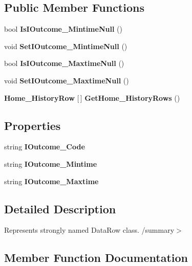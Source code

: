 \subsection*{Public Member Functions}
\begin{DoxyCompactItemize}
\item 
bool \textbf{ Is\+I\+Outcome\+\_\+\+Mintime\+Null} ()
\item 
void \textbf{ Set\+I\+Outcome\+\_\+\+Mintime\+Null} ()
\item 
bool \textbf{ Is\+I\+Outcome\+\_\+\+Maxtime\+Null} ()
\item 
void \textbf{ Set\+I\+Outcome\+\_\+\+Maxtime\+Null} ()
\item 
\textbf{ Home\+\_\+\+History\+Row} [$\,$] \textbf{ Get\+Home\+\_\+\+History\+Rows} ()
\end{DoxyCompactItemize}
\subsection*{Properties}
\begin{DoxyCompactItemize}
\item 
string \textbf{ I\+Outcome\+\_\+\+Code}\hspace{0.3cm}{\ttfamily  [get, set]}
\item 
string \textbf{ I\+Outcome\+\_\+\+Mintime}\hspace{0.3cm}{\ttfamily  [get, set]}
\item 
string \textbf{ I\+Outcome\+\_\+\+Maxtime}\hspace{0.3cm}{\ttfamily  [get, set]}
\end{DoxyCompactItemize}


\subsection{Detailed Description}
Represents strongly named Data\+Row class. /summary$>$ 

\subsection{Member Function Documentation}
\mbox{\label{class_a_f_h___scheduler_1_1_home_inspection_data_set_1_1_inspection___outcome_row_a8e5fb2723f6175b7764e924ecb705272}} 
